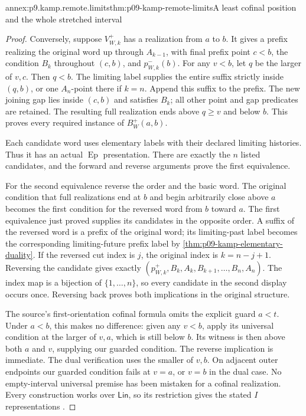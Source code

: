 \begin{annexitem}{annex:p9.kamp.remote.limits}{thm:p09-kamp-remote-limits}{A least cofinal position and the whole stretched interval}
\begin{proof}
Conversely, suppose \(V_{W,k}^+\) has a realization from
\(a\) to \(b\). It gives a prefix realizing the original
word up through \(A_{k-1}\), with final prefix point \(c<b\),
the condition \(B_k\) throughout \((c,b)\), and
\(p_{W,k}^-(b)\). For any \(v<b\), let \(q\) be
the larger of \(v,c\). Then \(q<b\). The limiting
label supplies the entire suffix strictly inside \((q,b)\),
or one \(A_n\)-point there if \(k=n\). Append this
suffix to the prefix. The new joining gap lies inside \((c,b)\)
and satisfies \(B_k\); all other point and gap predicates
are retained. The resulting full realization ends above \(q\geq v\)
and below \(b\). This proves every required instance of
\(B_W^+(a,b)\).

Each candidate word uses elementary labels with their declared
limiting histories. Thus it has an actual \(\operatorname{Ep}\)
presentation. There are exactly the \(n\) listed candidates,
and the forward and reverse arguments prove the first equivalence.

For the second equivalence reverse the order and the basic word.
The original condition that full realizations end at \(b\)
and begin arbitrarily close above \(a\) becomes the first
condition for the reversed word from \(b\) toward \(a\).
The first equivalence just proved supplies its candidates in the
opposite order. A suffix of the reversed word is a prefix of
the original word; its limiting-past label becomes the corresponding
limiting-future prefix label by
\cref{thm:p09-kamp-elementary-duality}. If the reversed cut
index is \(j\), the original index is \(k=n-j+1\).
Reversing the candidate gives exactly
\((p_{W,k}^+,B_k,A_k,B_{k+1},\ldots,B_n,A_n)\).
The index map is a bijection of \(\{1,\ldots,n\}\),
so every candidate in the second display occurs once. Reversing
back proves both implications in the original structure.

The source's first-orientation cofinal formula omits the explicit
guard \(a<t\). Under \(a<b\), this makes no difference:
given any \(v<b\), apply its universal condition at the
larger of \(v,a\), which is still below \(b\). Its
witness is then above both \(a\) and \(v\), supplying
our guarded condition. The reverse implication is immediate.
The dual verification uses the smaller of \(v,b\).
On adjacent outer endpoints our guarded condition fails at
\(v=a\), or \(v=b\) in the dual case. No empty-interval
universal premise has been mistaken for a cofinal realization.
Every construction works over \(\mathsf{Lin}\), so its
restriction gives the stated \(I\) representations
\cite[ch.~III, pp.~85, 89--90]{Kamp1968}.
\end{proof}
\end{annexitem}

